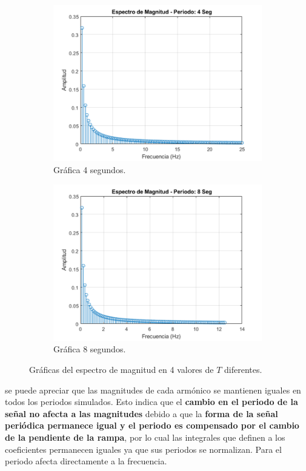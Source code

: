 \documentclass[11pt,a4paper,twocolumn]{article}
\begin{document}
\begin{figure}[H]
\begin{subfigure}[h]{0.45\linewidth}
            \includegraphics[width=\linewidth]{img/figure6_C.png}
            \caption{Gráfica 4 segundos.}
            \label{figure6_C}
        \end{subfigure}
        \begin{subfigure}[h]{0.45\linewidth}
            \includegraphics[width=\linewidth]{img/figure6_D.png}
            \caption{Gráfica 8 segundos.}
            \label{figure6_D}
        \end{subfigure}
        \caption{Gráficas del espectro de magnitud en 4 valores de $T$ diferentes.}
        \label{figure6}
    \end{figure}

    se puede apreciar que las magnitudes de cada armónico se mantienen iguales en todos 
    los periodos simulados. Esto indica que el \textbf{cambio en el periodo de la señal no afecta a las 
    magnitudes} debido a que la \textbf{forma de la señal periódica permanece igual y el periodo es 
    compensado por el cambio de la pendiente de la rampa}, por lo cual las integrales que 
    definen a los coeficientes permanecen iguales ya que sus periodos se normalizan. Para el 
    periodo afecta directamente a la frecuencia.
    
\end{document}
